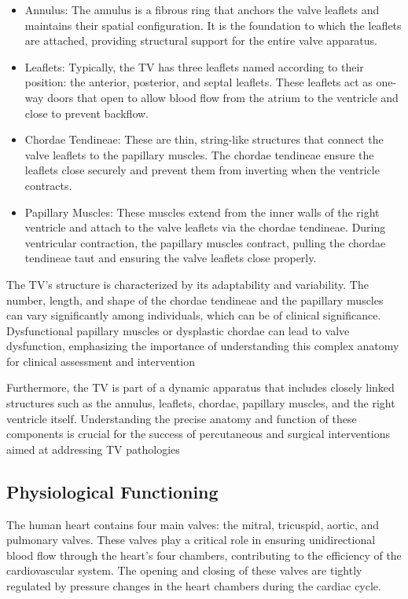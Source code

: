 \begin{itemize}
    \item Annulus: The annulus is a fibrous ring that anchors the valve leaflets and maintains their spatial configuration. It is the foundation to which the leaflets are attached, providing structural support for the entire valve apparatus.

    \item Leaflets: Typically, the \gls{TV} has three leaflets named according to their position: the anterior, posterior, and septal leaflets. These leaflets act as one-way doors that open to allow blood flow from the atrium to the ventricle and close to prevent backflow.

    \item Chordae Tendineae: These are thin, string-like structures that connect the valve leaflets to the papillary muscles. The chordae tendineae ensure the leaflets close securely and prevent them from inverting when the ventricle contracts.

    \item Papillary Muscles: These muscles extend from the inner walls of the right ventricle and attach to the valve leaflets via the chordae tendineae. During ventricular contraction, the papillary muscles contract, pulling the chordae tendineae taut and ensuring the valve leaflets close properly.
\end{itemize}

The \gls{TV}'s structure is characterized by its adaptability and variability. The number, length, and shape of the chordae tendineae and the papillary muscles can vary significantly among individuals, which can be of clinical significance. Dysfunctional papillary muscles or dysplastic chordae can lead to valve dysfunction, emphasizing the importance of understanding this complex anatomy for clinical assessment and intervention ~

Furthermore, the \gls{TV} is part of a dynamic apparatus that includes closely linked structures such as the annulus, leaflets, chordae, papillary muscles, and the right ventricle itself. Understanding the precise anatomy and function of these components is crucial for the success of percutaneous and surgical interventions aimed at addressing \gls{TV} pathologies ~
\subsection{Physiological Functioning}
The human heart contains four main valves: the mitral, tricuspid, aortic, and pulmonary valves. These valves play a critical role in ensuring unidirectional blood flow through the heart's four chambers, contributing to the efficiency of the cardiovascular system. The opening and closing of these valves are tightly regulated by pressure changes in the heart chambers during the cardiac cycle.

